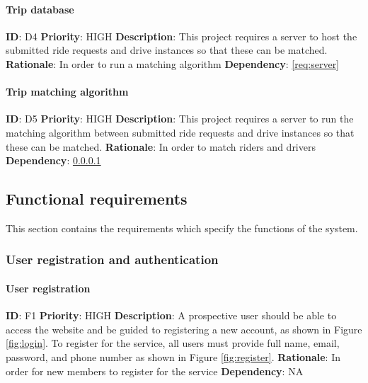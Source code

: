 \documentclass{article}
\begin{document}
\paragraph{Trip database}\label{req:tripDatabase}
\textbf{ID}: D4\newline
\textbf{Priority}: HIGH\newline
\textbf{Description}: This project requires a server to host the submitted ride requests and drive instances so that these can be matched.\newline
\textbf{Rationale}: In order to run a matching algorithm\newline
\textbf{Dependency}: \ref{req:server}

\paragraph{Trip matching algorithm}\label{req:matchAlgorithm}
\textbf{ID}: D5\newline
\textbf{Priority}: HIGH\newline
\textbf{Description}: This project requires a server to run the matching algorithm between submitted ride requests and drive instances so that these can be matched.\newline
\textbf{Rationale}: In order to match riders and drivers\newline
\textbf{Dependency}: \ref{req:tripDatabase}


\subsection{Functional requirements}
This section contains the requirements which specify the functions of the system.


\subsubsection{User registration and authentication}

\paragraph{User registration}\label{req:registration}
\textbf{ID}: F1\newline
\textbf{Priority}: HIGH\newline
\textbf{Description}: A prospective user should be able to access the website and be guided to registering a new account, as shown in Figure \ref{fig:login}. To register for the service, all users must provide full name, email, password, and phone number as shown in Figure \ref{fig:register}.\newline
\textbf{Rationale}: In order for new members to register for the service\newline
\textbf{Dependency}: NA
\end{document}
